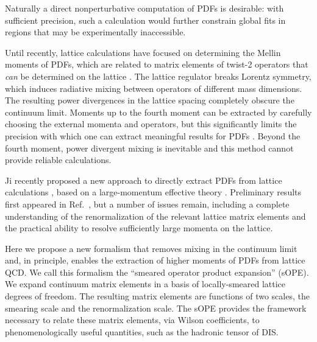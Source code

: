 Naturally a direct nonperturbative computation of PDFs is desirable: with 
sufficient precision, such a calculation would further constrain global fits in 
regions that may be 
experimentally inaccessible.

Until recently, lattice calculations have focused on determining the Mellin 
moments of PDFs, which are related to matrix elements of twist-2
operators that \emph{can} be determined on the lattice 
\cite{Bali:2012av,Braun:2008ur,Guagnelli:2004ga}. The lattice regulator breaks 
Lorentz symmetry, which induces radiative mixing
between operators of different mass dimensions. The resulting power divergences 
in the lattice spacing completely 
obscure the continuum limit. Moments up to the fourth moment 
can 
be extracted by carefully choosing the external momenta and operators, but this 
significantly 
limits the precision with which one can 
extract meaningful results for PDFs \cite{Detmold:2003rq,Detmold:2001dv}. 
Beyond 
the fourth moment, power divergent mixing is inevitable and this method cannot 
provide reliable calculations.

Ji recently proposed a new approach to directly extract PDFs from lattice 
calculations \cite{Ma:2014jla,Ji:2013dva}, 
based on a large-momentum effective theory \cite{Ji:2014gla}. Preliminary 
results first appeared in Ref.~\cite{Lin:2014zya}, but a number of issues 
remain, including a complete understanding of the renormalization of the 
relevant lattice matrix elements and the practical ability to resolve 
sufficiently large momenta on the lattice.

Here we propose a new formalism that removes mixing in the continuum limit and, 
in 
principle, enables the extraction of higher moments of PDFs from lattice QCD. 
We call this formalism the ``smeared operator product expansion'' (sOPE). We 
expand continuum matrix elements in a basis of locally-smeared lattice 
degrees of 
freedom. The resulting matrix elements are functions of two scales, the 
smearing 
scale and the renormalization scale. The sOPE provides the framework necessary 
to relate these matrix elements, via Wilson coefficients, to 
phenomenologically useful quantities, such as the hadronic tensor of DIS.

